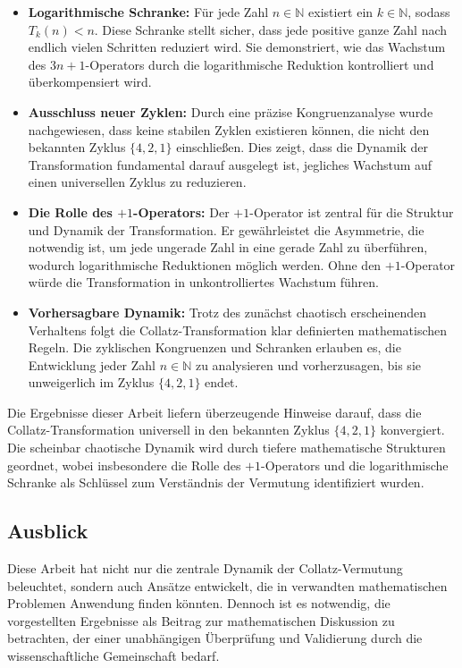 \documentclass[a4paper,12pt]{article}
\begin{document}
\begin{itemize}
    \item \textbf{Logarithmische Schranke:} Für jede Zahl \( n \in \mathbb{N} \) existiert ein \( k \in \mathbb{N} \), sodass \( T_k(n) < n \). Diese Schranke stellt sicher, dass jede positive ganze Zahl nach endlich vielen Schritten reduziert wird. Sie demonstriert, wie das Wachstum des \( 3n+1 \)-Operators durch die logarithmische Reduktion kontrolliert und überkompensiert wird.
    \item \textbf{Ausschluss neuer Zyklen:} Durch eine präzise Kongruenzanalyse wurde nachgewiesen, dass keine stabilen Zyklen existieren können, die nicht den bekannten Zyklus \( \{4, 2, 1\} \) einschließen. Dies zeigt, dass die Dynamik der Transformation fundamental darauf ausgelegt ist, jegliches Wachstum auf einen universellen Zyklus zu reduzieren.
    \item \textbf{Die Rolle des \(+1\)-Operators:} Der \(+1\)-Operator ist zentral für die Struktur und Dynamik der Transformation. Er gewährleistet die Asymmetrie, die notwendig ist, um jede ungerade Zahl in eine gerade Zahl zu überführen, wodurch logarithmische Reduktionen möglich werden. Ohne den \(+1\)-Operator würde die Transformation in unkontrolliertes Wachstum führen.
    \item \textbf{Vorhersagbare Dynamik:} Trotz des zunächst chaotisch erscheinenden Verhaltens folgt die Collatz-Transformation klar definierten mathematischen Regeln. Die zyklischen Kongruenzen und Schranken erlauben es, die Entwicklung jeder Zahl \( n \in \mathbb{N} \) zu analysieren und vorherzusagen, bis sie unweigerlich im Zyklus \( \{4, 2, 1\} \) endet.
\end{itemize}

Die Ergebnisse dieser Arbeit liefern überzeugende Hinweise darauf, dass die Collatz-Transformation universell in den bekannten Zyklus \( \{4, 2, 1\} \) konvergiert. Die scheinbar chaotische Dynamik wird durch tiefere mathematische Strukturen geordnet, wobei insbesondere die Rolle des \(+1\)-Operators und die logarithmische Schranke als Schlüssel zum Verständnis der Vermutung identifiziert wurden.

\subsection*{Ausblick}
Diese Arbeit hat nicht nur die zentrale Dynamik der Collatz-Vermutung beleuchtet, sondern auch Ansätze entwickelt, die in verwandten mathematischen Problemen Anwendung finden könnten. Dennoch ist es notwendig, die vorgestellten Ergebnisse als Beitrag zur mathematischen Diskussion zu betrachten, der einer unabhängigen Überprüfung und Validierung durch die wissenschaftliche Gemeinschaft bedarf.
\end{document}
